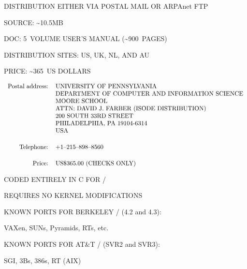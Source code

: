 \begin{bwslide}

\begin{nrtc}
\item	DISTRIBUTION EITHER VIA POSTAL MAIL OR ARPAnet FTP
    \begin{nrtc}
    \item	SOURCE: \~{}10.5MB

    \item	DOC: 5~VOLUME USER'S MANUAL (\~{}900~PAGES)

    \item	DISTRIBUTION SITES: US, UK, NL, AND AU

    \item	PRICE: \~{}365~US DOLLARS
    \end{nrtc}
\end{nrtc}
\end{bwslide}


\begin{bwslide}
\small

\[\begin{tabular}{rl}
Postal address:&UNIVERSITY OF PENNSYLVANIA\\
&		DEPARTMENT OF COMPUTER AND INFORMATION SCIENCE\\
&		MOORE SCHOOL\\
&		ATTN: DAVID J. FARBER (ISODE DISTRIBUTION)\\
&		200 SOUTH 33RD STREET\\
&		PHILADELPHIA, PA 19104-6314\\
&		USA\\[0.2in]
Telephone:&	+1--215--898--8560\\[0.2in]
Price:&		US\$365.00 (CHECKS ONLY)
\end{tabular}\]
\end{bwslide}


\begin{bwslide}

\begin{nrtc}
\item	CODED ENTIRELY IN C FOR \unix/
    \begin{nrtc}
    \item	REQUIRES NO KERNEL MODIFICATIONS    
    \end{nrtc}

\item	KNOWN PORTS FOR BERKELEY \unix/ (4.2 and 4.3):
    \begin{nrtc}
    \item	VAXen, SUNs, Pyramids, RTs, etc.
    \end{nrtc}

\item	KNOWN PORTS FOR AT\&T \unix/ (SVR2 and SVR3):
    \begin{nrtc}
    \item	SGI, 3Bs, 386s, RT (AIX)
    \end{nrtc}
\end{nrtc}
\end{bwslide}


